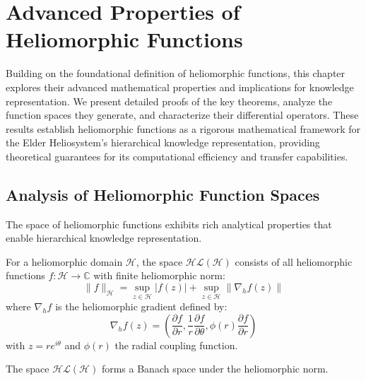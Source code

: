 \chapter{Advanced Properties of Heliomorphic Functions}

\begin{tcolorbox}[colback=DarkSkyBlue!5!white,colframe=DarkSkyBlue!75!black,title=Chapter Summary]
Building on the foundational definition of heliomorphic functions, this chapter explores their advanced mathematical properties and implications for knowledge representation. We present detailed proofs of the key theorems, analyze the function spaces they generate, and characterize their differential operators. These results establish heliomorphic functions as a rigorous mathematical framework for the Elder Heliosystem's hierarchical knowledge representation, providing theoretical guarantees for its computational efficiency and transfer capabilities.
\end{tcolorbox}

\section{Analysis of Heliomorphic Function Spaces}

The space of heliomorphic functions exhibits rich analytical properties that enable hierarchical knowledge representation.

\begin{definition}
For a heliomorphic domain $\mathcal{H}$, the space $\mathcal{HL}(\mathcal{H})$ consists of all heliomorphic functions $f: \mathcal{H} \rightarrow \mathbb{C}$ with finite heliomorphic norm:
\begin{equation}
\|f\|_{\mathcal{H}} = \sup_{z \in \mathcal{H}} |f(z)| + \sup_{z \in \mathcal{H}} \|\nabla_h f(z)\|
\end{equation}
where $\nabla_h f$ is the heliomorphic gradient defined by:
\begin{equation}
\nabla_h f(z) = \left(\frac{\partial f}{\partial r}, \frac{1}{r}\frac{\partial f}{\partial \theta}, \phi(r)\frac{\partial f}{\partial r}\right)
\end{equation}
with $z = re^{i\theta}$ and $\phi(r)$ the radial coupling function.
\end{definition}

\begin{theorem}
The space $\mathcal{HL}(\mathcal{H})$ forms a Banach space under the heliomorphic norm.
\end{theorem}

